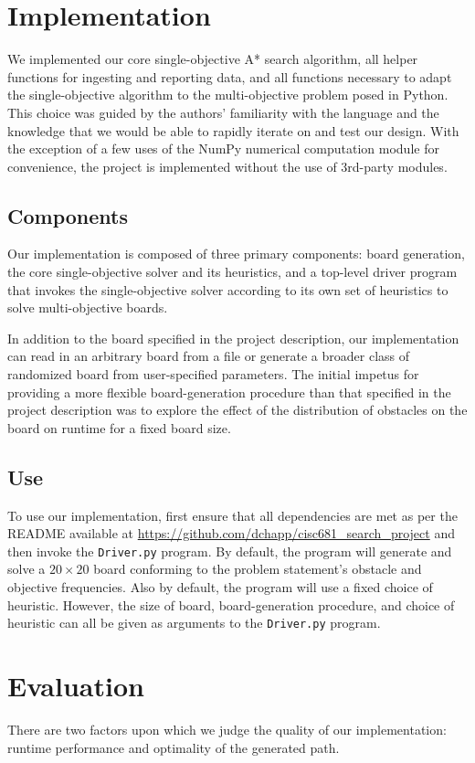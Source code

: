 \documentclass[12pt, conference, compsocconf]{IEEEtran}
\begin{document}
\section{Implementation}
We implemented our core single-objective A* search algorithm, all helper functions for ingesting and reporting data, and all functions necessary to adapt the single-objective algorithm to the multi-objective problem posed in Python. 
This choice was guided by the authors' familiarity with the language and the knowledge that we would be able to rapidly iterate on and test our design.
With the exception of a few uses of the NumPy numerical computation module for convenience, the project is implemented without the use of 3rd-party modules. 

\subsection{Components}
Our implementation is composed of three primary components: board generation, the core single-objective solver and its heuristics, and a top-level driver program that invokes the single-objective solver according to its own set of heuristics to solve multi-objective boards. 

In addition to the board specified in the project description, our implementation can read in an arbitrary board from a file or generate a broader class of randomized board from user-specified parameters. 
The initial impetus for providing a more flexible board-generation procedure than that specified in the project description was to explore the effect of the distribution of obstacles on the board on runtime for a fixed board size.

\subsection{Use}
To use our implementation, first ensure that all dependencies are met as per the README available at \url{https://github.com/dchapp/cisc681_search_project} and then invoke the \texttt{Driver.py} program. 
By default, the program will generate and solve a $20 \times 20$ board conforming to the problem statement's obstacle and objective frequencies.
Also by default, the program will use a fixed choice of heuristic.
However, the size of board, board-generation procedure, and choice of heuristic can all be given as arguments to the \texttt{Driver.py} program. 

\section{Evaluation}
There are two factors upon which we judge the quality of our implementation: runtime performance and optimality of the generated path.  
\end{document}

